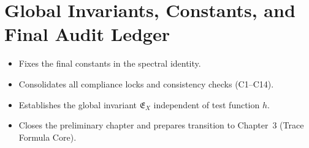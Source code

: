 
\section{Global Invariants, Constants, and Final Audit Ledger} \label{sec:global-invariants} \relax \hspace{0pt} %

\begin{tcolorbox}[colback=gray!4,colframe=gray!60,title={Scope (Part~5/5)}] %
\begin{itemize}
  \item Fixes the final constants in the spectral identity. %
  \item Consolidates all compliance locks and consistency checks (C1–C14). %
  \item Establishes the global invariant \(\mathfrak{E}_X\) independent of test function \(h\). %
  \item Closes the preliminary chapter and prepares transition to Chapter~3 (Trace Formula Core). %
\end{itemize}
\end{tcolorbox}

